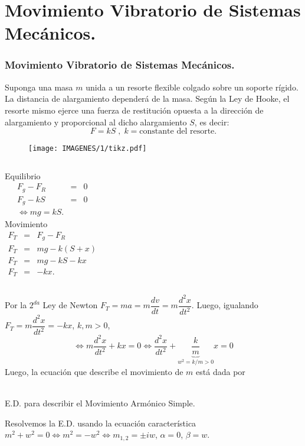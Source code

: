 \documentclass{beamer}
\begin{document}
\frame{\titlepage}

\section{Movimiento Vibratorio de Sistemas Mecánicos.} %
\begin{frame}[t]
	\frametitle{Movimiento Vibratorio de Sistemas Mecánicos.}
	Suponga una masa \(m\) unida a un resorte flexible colgado sobre un soporte rígido. La distancia de alargamiento dependerá de la masa. Según la Ley de Hooke, el resorte mismo ejerce una fuerza de restitución opuesta a la dirección de alargamiento y proporcional al dicho alargamiento \(S\), es decir:
	\[
		F=kS \;,\; k = \mbox{constante del resorte.}
	\]
	\begin{figure}[ht]
		\centering
		\texttt{[image: IMAGENES/1/tikz.pdf]}
	\end{figure}
\end{frame}

\begin{frame}[t]
	\begin{columns}
		Equilibrio
		\[
			\begin{array}{rcl}
				F_g-F_R & = & 0 \\
				F_g-kS & = & 0 \\
				\iff mg = kS.
			\end{array}
		\]
		Movimiento
		\[
			\begin{array}{rcl}
				F_T & = & F_g-F_R \\
				F_T & = & mg - k(S+x) \\
				F_T & = & mg - kS-kx \\
				F_T & = & -kx.
			\end{array}
		\]
	\end{columns}
\end{frame}

\begin{frame}[t]
	\begin{block}{}
		Por la \(2^{da}\) Ley de Newton \(F_T = ma = m \dfrac{dv}{dt} = m \dfrac{d^2x}{dt^2}\). Luego, igualando \(F_T = m \dfrac{d^2x}{dt^2} = -kx\), \(k,m >0\),
		\[
			\iff m \dfrac{d^2x}{dt^2} +kx =0 \iff \dfrac{d^2x}{dt^2} + \underbrace{\dfrac{k}{m}} _{w^2 = k/m >0}  x =0
		\]
		Luego, la ecuación que describe el movimiento de \(m\) está dada por
		\begin{center}
			\color{red}  \\
			\footnotesize E.D. para describir el Movimiento Armónico Simple.
		\end{center} 
		Resolvemos la E.D. usando la ecuación característica \(m^2+w^2=0 \iff m^2=-w^2 \iff m_{1,2} = \pm iw\), \(\alpha =0\), \(\beta =w\).
	\end{block}
\end{frame}
\end{document}
